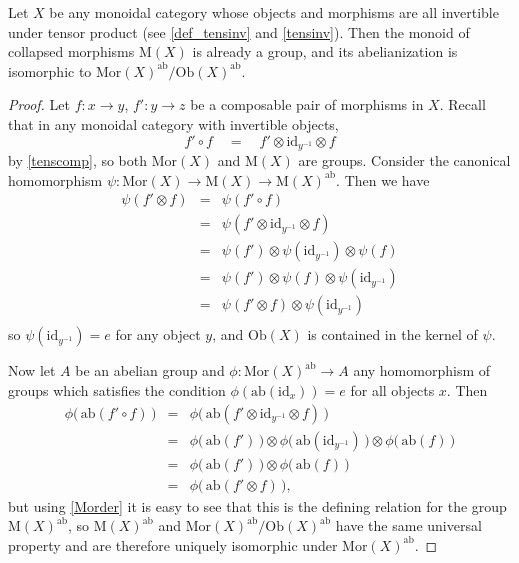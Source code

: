 \documentclass{amsbook} %
\numberwithin{section}{chapter}
\begin{document}
\begin{lem} \label{colquot} Let $X$ be any monoidal category whose objects and morphisms are all invertible under tensor product (see \cref{def_tensinv} and \cref{tensinv}). Then the monoid of collapsed morphisms $\mathrm{M}(X)$ is already a group, and its abelianization is isomorphic to $\mathrm{Mor}(X)^{\mathrm{ab}}/ \mathrm{Ob}(X)^{\mathrm{ab}}$.

\end{lem}
\begin{proof}
Let  $f: x \to y$, $f': y \to z$ be a composable pair of morphisms in $X$. Recall  that in any monoidal category with invertible objects,
\[ f' \circ f \quad = \quad f' \otimes \mathrm{id}_{y^{-1}} \otimes f \]
by \cref{tenscomp}, so both $\mathrm{Mor}(X)$ and $\mathrm{M}(X)$ are groups. Consider the canonical homomorphism $\psi: \mathrm{Mor}(X) \to \mathrm{M}(X) \to \mathrm{M}(X)^{\mathrm{ab}}$. Then we have
\[ \begin{array}{rll}
			\psi(f' \otimes f) & = & \psi(f' \circ f) \\
			& = & \psi(f' \otimes \mathrm{id}_{y^{-1}} \otimes f) \\
			& = & \psi(f') \otimes \psi(\mathrm{id}_{y^{-1}}) \otimes \psi(f) \\
			& = & \psi(f') \otimes \psi(f) \otimes \psi(\mathrm{id}_{y^{-1}}) \\
			& = & \psi(f' \otimes f) \otimes \psi(\mathrm{id}_{y^{-1}}) \\
		\end{array}
\]
so $\psi(\mathrm{id}_{y^{-1}}) = e$ for any object $y$, and $\mathrm{Ob}(X)$ is contained in the kernel of $\psi$.

Now let $A$ be an abelian group and $\phi: \mathrm{Mor}(X)^{\mathrm{ab}} \to A$ any homomorphism of groups which satisfies the condition $\phi(\mathrm{ab}(\mathrm{id}_x)) = e$ for all objects $x$. Then
\[ \begin{array}{rll}
			\phi\big( \, \mathrm{ab}(f' \circ f) \, \big)  & = & \phi\big( \, \mathrm{ab}(f' \otimes \mathrm{id}_{y^{-1}} \otimes f) \, \big) \\
			& = & \phi\big( \, \mathrm{ab}(f') \, \big) \otimes \phi\big( \, \mathrm{ab}(\mathrm{id}_{y^{-1}}) \, \big) \otimes \phi\big( \, \mathrm{ab}(f) \, \big) \\
			& = & \phi\big( \, \mathrm{ab}(f') \, \big) \otimes \phi\big( \, \mathrm{ab}(f) \, \big) \\
			& = & \phi\big( \, \mathrm{ab}(f' \otimes f) \, \big),
		\end{array}
\]
but using \cref{Morder} it is easy to see that this is the defining relation for the group $\mathrm{M}(X)^{\mathrm{ab}}$, so $\mathrm{M}(X)^{\mathrm{ab}}$ and $\mathrm{Mor}(X)^{\mathrm{ab}}/\mathrm{Ob}(X)^{\mathrm{ab}}$ have the same universal property and are therefore uniquely isomorphic under $\mathrm{Mor}(X)^{\mathrm{ab}}$.
\end{proof}
\end{document}
